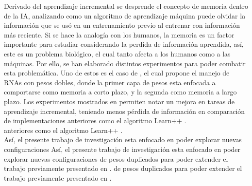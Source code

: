   Derivado del aprendizaje incremental se desprende el concepto de memoria dentro de la IA, analizando como un algoritmo de aprendizaje máquina puede olvidar la información que se us\'o en un entrenamiento previo al entrenar con información más reciente. Si se hace la analogía con los humanos, la memoria es un factor importante para estudiar considerando la perdida de información aprendida, así, este es un problema biol\'ogico, el cual tanto afecta a los humanos como a las m\'aquinas. Por ello, se han elaborado distintos experimentos para poder combatir esta problemática. Uno de estos es el caso de \cite{bullinaria2009}, el cual propone el manejo de RNAs con pesos dobles, donde la primer capa de pesos esta enfocada a comportarse como memoria a corto plazo, y la segunda como memoria a largo plazo.  Los experimentos mostrados en \cite{bullinaria2009} permiten notar un mejora en tareas de aprendizaje incremental, teniendo menos p\'erdida de información en comparación de implementaciones anteriores como el algoritmo  Learn++ \cite{li2008, Elwell2011}.\\ anteriores como el algoritmo  Learn++ \cite{li2008, Elwell2011}.\\
    
  Así, el presente trabajo de investigación esta enfocado en poder explorar nuevas configuraciones      Así, el presente trabajo de investigación esta enfocado en poder explorar nuevas configuraciones de pesos duplicados para poder extender el trabajo previamente presentado en \cite{bullinaria2009}.   de pesos duplicados para poder extender el trabajo previamente presentado en \cite{bullinaria2009}.